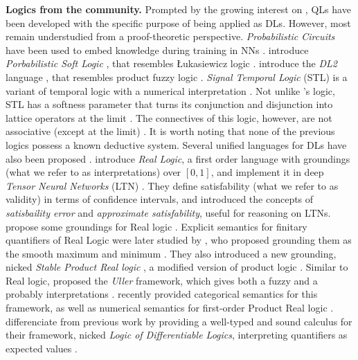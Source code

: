 \textbf{Logics from the \InAI{} community.} Prompted by the growing interest on \InAI{}, QLs have been developed with the specific purpose of being applied as DLs. However, most remain understudied from a proof-theoretic perspective. \emph{Probabilistic Circuits} have been used to embed knowledge during training in NNs \citep{NEURIPS2022_b6089408, braun2025tractablerepresentationlearningprobabilistic}. \citeauthor{kimmig2012short} introduce \emph{Porbabilistic Soft Logic} \citep{kimmig2012short}, that resembles  Łukasiewicz logic \cite{cintula2011handbook,prooffuzzy}. \citeauthor{fischer2019dl2} introduce the \emph{DL2} language \citep{fischer2019dl2}, that resembles product fuzzy logic \citep{cintula2011handbook, prooffuzzy}. \emph{Signal Temporal Logic} (STL) is a variant of temporal logic with a numerical interpretation \citep{varnai2020robustness}. Not unlike \citeauthor{capucci2024quantifiers}'s logic, STL has a softness parameter that turns its conjunction and disjunction into lattice operators at the limit \citep{varnai2020robustness}. The connectives of this logic, however, are not associative (except at the limit) \citep{affeldt2024taming}. It is worth noting that none of the previous logics possess a known deductive system. Several unified languages for DLs have also been proposed \citep{badreddine2022logic, van2024uller, slusarz2023logic}. \citeauthor{serafini2016logic} introduce \emph{Real Logic}, a first order language with groundings (what we refer to as interpretations) over $[0,1]$, and implement it in deep \emph{Tensor Neural Networks} (LTN) \cite{badreddine2022logic}.   
They define satisfability (what we refer to as validity) in terms of confidence intervals, and introduced the concepts of \emph{satisbaility error} and \emph{approximate satisfability}, useful for reasoning on LTNs.  \citeauthor{van2022analyzing} propose some groundings for Real logic \citep{van2022analyzing}. Explicit semantics for finitary quantifiers of Real Logic were later studied by \citeauthor{badreddine2022logic}, who proposed grounding them as the smooth maximum and minimum \citep{badreddine2022logic}. They also introduced a new grounding, nicked \emph{Stable Product Real logic} \citep{badreddine2022logic}, a modified version of product logic \citep{van2022analyzing}. Similar to Real logic, \citeauthor{van2024uller} proposed the \emph{Uller} framework, which gives both a fuzzy and a probably interpretations \citep{van2022analyzing}. \citeauthor{schellhorn2025muller} recently provided categorical semantics for this framework, as well as numerical semantics for first-order Product Real logic \citep{schellhorn2025muller}. \citeauthor{slusarz2023logic} differenciate from previous work by providing a well-typed and sound calculus for their framework, nicked \emph{Logic of Differentiable Logics}, interpreting quantifiers as expected values \citep{slusarz2023logic}. 

